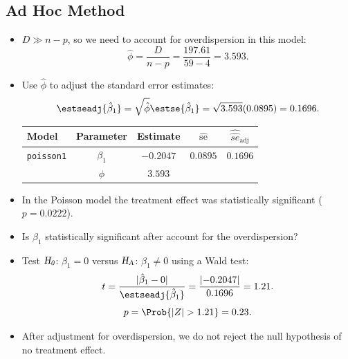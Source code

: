 \documentclass{article}\usepackage[]{graphicx}\usepackage[svgnames]{xcolor}
\newcommand{\HN}{\textsl{H}_{\textsl{0}}}%
\newcommand{\HA}{\textsl{H}_{\textsl{A}}}%
\DeclarePairedDelimiter\abs{\lvert}{\rvert}
\begin{document}
\subsection*{Ad Hoc Method}
\begin{itemize}
      \item $ D\gg n-p $, so we need to account for overdispersion in this model:
            \[ \hat{\phi}=\frac{D}{n-p}=\frac{197.61}{59-4}=3.593. \]
      \item Use $ \hat{\phi} $ to adjust the standard error estimates:
            \[ \estseadj{\hat{\beta}_1}=\sqrt{\hat{\phi}}\estse{\hat{\beta}_1}=\sqrt{3.593}(0.0895)=0.1696. \]
            \begin{table}[H]
                  \centering
                  \begin{tabular}{lcccc}
                        Model             & Parameter   & Estimate    & $ \hat{\text{se}} $ & $ \widehat{\hat{se}}_{\text{adj}} $ \\
                        \midrule
                        \texttt{poisson1} & $ \beta_1 $ & $ -0.2047 $ & $ 0.0895 $          & $0.1696$                            \\
                                          & $ \phi $    & $3.593$                                                                 \\
                        \bottomrule
                  \end{tabular}
            \end{table}
      \item In the Poisson model the treatment effect was statistically significant ($ p=0.0222 $).
      \item Is $ \beta_1 $ statistically significant after account for the overdispersion?
      \item Test $ \HN $: $ \beta_1=0 $ versus $ \HA $: $ \beta_1\ne 0 $ using a Wald test:
            \[ t=\frac{\abs{\hat{\beta}_1-0}}{\estseadj{\hat{\beta}_1}}=\frac{\abs{-0.2047}}{0.1696}=1.21. \]
            \[ p=\Prob{\abs{Z}>1.21}=0.23. \]
      \item After adjustment for overdispersion, we do not reject the null hypothesis of no
            treatment effect.
\end{itemize}
\end{document}
